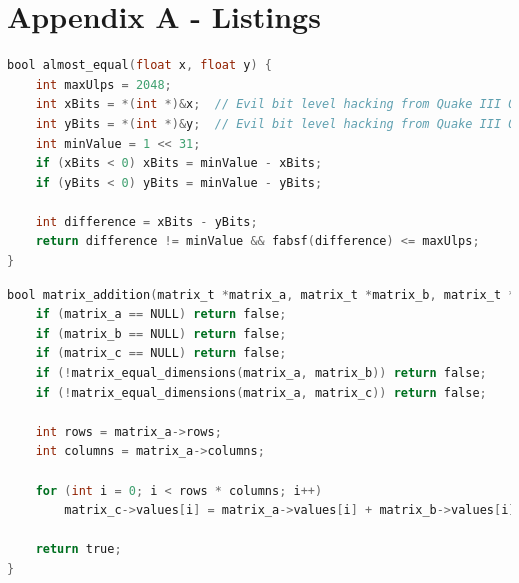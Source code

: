 \section*{Appendix A - Listings}

\begin{lstlisting}[language=C, caption={Almost Equal algorithm}, label={lst:almost_equal}]
bool almost_equal(float x, float y) {
    int maxUlps = 2048;
    int xBits = *(int *)&x;  // Evil bit level hacking from Quake III Q_sqrt
    int yBits = *(int *)&y;  // Evil bit level hacking from Quake III Q_sqrt
    int minValue = 1 << 31;
    if (xBits < 0) xBits = minValue - xBits;
    if (yBits < 0) yBits = minValue - yBits;

    int difference = xBits - yBits;
    return difference != minValue && fabsf(difference) <= maxUlps;
}
\end{lstlisting}

\begin{lstlisting}[language=C, caption={CPU addition algorithm}, label={lst:cpu_addition}]
bool matrix_addition(matrix_t *matrix_a, matrix_t *matrix_b, matrix_t *matrix_c) {
    if (matrix_a == NULL) return false;
    if (matrix_b == NULL) return false;
    if (matrix_c == NULL) return false;
    if (!matrix_equal_dimensions(matrix_a, matrix_b)) return false;
    if (!matrix_equal_dimensions(matrix_a, matrix_c)) return false;

    int rows = matrix_a->rows;
    int columns = matrix_a->columns;

    for (int i = 0; i < rows * columns; i++)
        matrix_c->values[i] = matrix_a->values[i] + matrix_b->values[i];

    return true;
}
\end{lstlisting}

